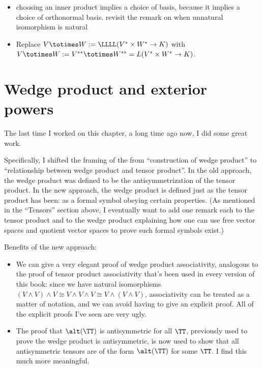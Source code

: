 \begin{itemize}
    \item choosing an inner product implies a choice of basis, because it implies a choice of orthonormal basis. revisit the remark on when unnatural isomorphism is natural
    \item Replace $V \totimes W := \LLLL(V^* \times W^* \rightarrow K)$ with $V \totimes W := V^{**} \totimes W^{**} = L(V^* \times W^* \rightarrow K)$.
\end{itemize}

\section*{Wedge product and exterior powers}

The last time I worked on this chapter, a long time ago now, I did some great work.

Specifically, I shifted the framing of the from ``construction of wedge product'' to ``relationship between wedge product and tensor product''. In the old approach, the wedge product was defined to be the antisymmetrization of the tensor product. In the new approach, the wedge product is defined just as the tensor product has been: as a formal symbol obeying certain properties. (As mentioned in the ``Tensors'' section above, I eventually want to add one remark each to the tensor product and to the wedge product explaining how one can use free vector spaces and quotient vector spaces to prove such formal symbols exist.)

Benefits of the new approach:

\begin{itemize}
	\item We can give a very elegant proof of wedge product associativity, analogous to the proof of tensor product associativity that's been used in every version of this book: since we have natural isomorphisms $(V \wedge V) \wedge V \cong V \wedge V \wedge V \cong V \wedge (V \wedge V)$, associativity can be treated as a matter of notation, and we can avoid having to give an explicit proof. All of the explicit proofs I've seen are very ugly.
	\item The proof that $\alt(\TT)$ is antisymmetric for all $\TT$, previously used to prove the wedge product is antisymmetric, is now used to show that all antisymmetric tensors are of the form $\alt(\TT)$ for some $\TT$. I find this much more meaningful.
\end{itemize}


